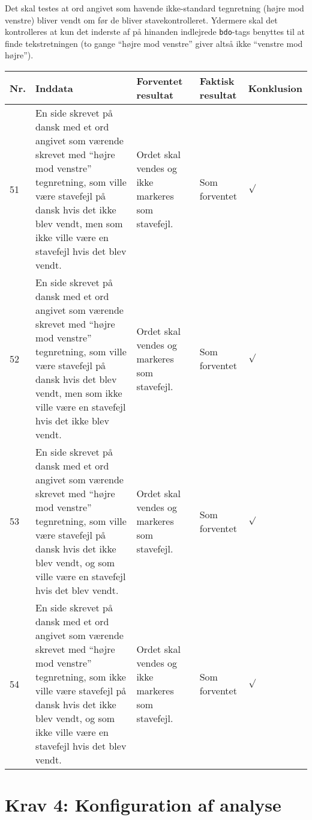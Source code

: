 \documentclass[a4paper,oneside,article]{memoir}
\begin{document}
\begin{landscape}
Det skal testes at ord angivet som havende ikke-standard tegnretning
(højre mod venstre) bliver vendt om før de bliver
stavekontrolleret. Ydermere skal det kontrolleres at kun det inderste
af på hinanden indlejrede \texttt{bdo}-tags benyttes til at finde
tekstretningen (to gange ``højre mod venstre'' giver altså ikke
``venstre mod højre'').

\begin{longtable}[c]{p{20pt}|p{220pt}|p{130pt}|p{130pt}|p{50pt}}
\textbf{Nr.} &
\textbf{Inddata} &
\textbf{Forventet resultat} &
\textbf{Faktisk resultat} &
\textbf{Konklusion} \\ \hline

51 &
En side skrevet på dansk med et ord angivet som værende skrevet med
``højre mod venstre'' tegnretning, som ville være stavefejl på dansk
hvis det ikke blev vendt, men som ikke ville være en stavefejl hvis det blev vendt. &
Ordet skal vendes og ikke markeres som stavefejl. &
Som forventet &
$\surd$ \\ \hline

52 &
En side skrevet på dansk med et ord angivet som værende skrevet med
``højre mod venstre'' tegnretning, som ville være stavefejl på dansk
hvis det blev vendt, men som ikke ville være en stavefejl hvis det
ikke blev vendt. &
Ordet skal vendes og markeres som stavefejl. &
Som forventet &
$\surd$ \\ \hline

53 &
En side skrevet på dansk med et ord angivet som værende skrevet med
``højre mod venstre'' tegnretning, som ville være stavefejl på dansk
hvis det ikke blev vendt, og som ville være en stavefejl hvis det blev
vendt. &
Ordet skal vendes og markeres som stavefejl. &
Som forventet &
$\surd$ \\ \hline

54 &
En side skrevet på dansk med et ord angivet som værende skrevet med
``højre mod venstre'' tegnretning, som ikke ville være stavefejl på dansk
hvis det ikke blev vendt, og som ikke ville være en stavefejl hvis
det blev vendt. &
Ordet skal vendes og ikke markeres som stavefejl. &
Som forventet &
$\surd$ \\ \hline

\end{longtable}

\section{Krav 4: Konfiguration af analyse}


\end{landscape}
\end{document}
